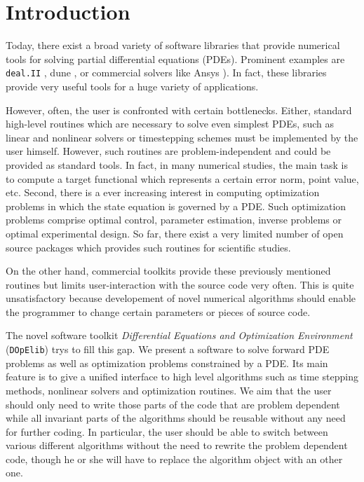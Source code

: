 \documentclass[prodmode,acmtoms]{acmsmall}
\numberwithin{equation}{section}
\newcommand{\deal}{\texttt{deal.II}}
\newcommand{\dope}{\texttt{DOpElib}}
\begin{document}
\section{Introduction}
\label{introduction}
Today, there exist a broad variety of software libraries
that provide numerical tools for solving partial differential
equations (PDEs). Prominent examples are 
\deal{} \cite{dealnew}, dune \cite{dune} , 
or commercial solvers like Ansys \cite{ansys}). 
In fact, these libraries provide very useful tools 
for a huge variety of applications. 

However, often, the user is confronted with 
certain bottlenecks. Either, standard high-level routines 
which are necessary to solve even simplest PDEs,
such as linear and nonlinear solvers or timestepping schemes must be implemented 
by the user himself. However, such routines are problem-independent 
and could be provided as standard tools. In fact, in many 
numerical studies, the main task is to compute a  
target functional which represents a certain error norm,
point value, etc.
Second, there is a ever increasing interest in computing 
optimization problems in which the state equation is governed 
by a PDE. Such optimization problems comprise optimal control,
parameter estimation, inverse problems or optimal experimental design. 
So far, there exist a very limited number of open source packages
which provides such routines for scientific studies.

On the other hand, 
commercial toolkits provide these previously mentioned routines but limits user-interaction
with the source code very often. This is quite unsatisfactory because
developement of novel numerical algorithms should enable the programmer
to change certain parameters or pieces of source code. 


The novel software toolkit 
\textit{Differential Equations and Optimization Environment} (\dope{}) 
trys to fill this gap. We present a software
to solve forward PDE
problems as well as optimization problems constrained by a PDE. 
Its main feature is to give a unified interface to high level algorithms such as 
time stepping methods, nonlinear solvers and optimization routines. 
We aim that the user should only need to write those parts
of the code that are problem dependent while all invariant parts of the algorithms
should be reusable without any need for further coding.
In particular, the user should be able to switch between various different 
algorithms without the need to rewrite the problem dependent code, though he or she will
have to replace the algorithm object with an other one. 
\end{document}
